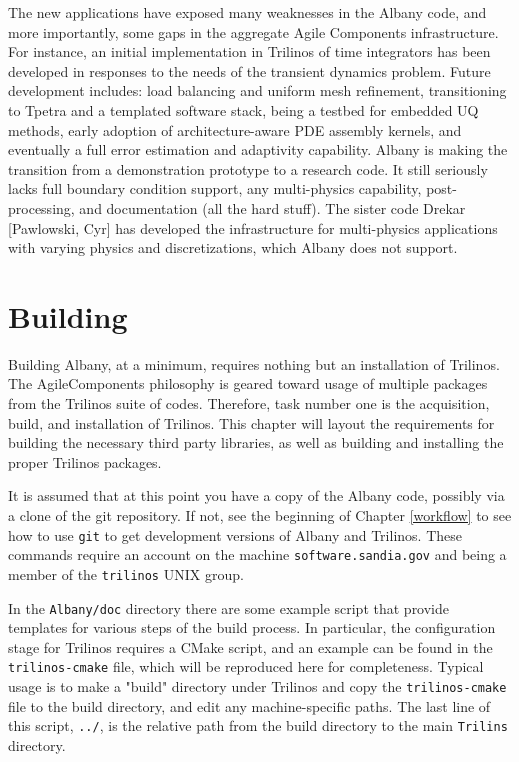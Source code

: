 \documentclass[pdf,12pt,report,strict]{SANDreport}
\theoremstyle{remark}
\begin{document}
The new applications have exposed many weaknesses in the Albany code,
and more importantly, some gaps in the aggregate Agile Components
infrastructure. For instance, an initial implementation in Trilinos of
time integrators has been developed in responses to the needs of the
transient dynamics problem. Future development includes: load
balancing and uniform mesh refinement, transitioning to Tpetra and a
templated software stack, being a testbed for embedded UQ methods,
early adoption of architecture-aware PDE assembly kernels, and
eventually a full error estimation and adaptivity capability. Albany
is making the transition from a demonstration prototype to a research
code. It still seriously lacks full boundary condition support, any
multi-physics capability, post-processing, and documentation (all the
hard stuff). The sister code Drekar [Pawlowski, Cyr] has developed the
infrastructure for multi-physics applications with varying physics and
discretizations, which Albany does not support.

\chapter{Building}
\label{build}

Building Albany, at a minimum, requires nothing but an installation of
Trilinos. The AgileComponents philosophy is geared toward usage of
multiple packages from the Trilinos suite of codes. Therefore, task
number one is the acquisition, build, and installation of
Trilinos. This chapter will layout the requirements for building the
necessary third party libraries, as well as building and installing
the proper Trilinos packages.  

It is assumed that at this point you
have a copy of the Albany code, possibly via a clone of the git
repository. If not, see the beginning of Chapter \ref{workflow} 
to see how to use \texttt{git} to get development versions of Albany and Trilinos.
These commands require an account on the machine \texttt{software.sandia.gov}
and being a member of the \texttt{trilinos} UNIX group.

In the {\tt Albany/doc} directory there are some example
script that provide templates for various steps of the build
process. In particular, the configuration stage for Trilinos requires
a CMake script, and an example can be found in the {\tt
  trilinos-cmake} file, which will be reproduced here for
completeness. Typical usage is to make a "build" directory
under Trilinos and copy the {\tt trilinos-cmake} file to
the build directory, and edit any machine-specific paths. 
The last line of this script, {\tt  ../}, is the relative
path from the build directory to the main {\tt Trilins} 
directory.
\end{document}
